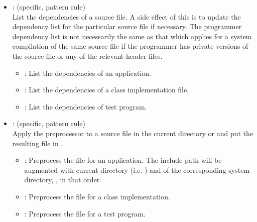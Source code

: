 \begin{itemize}
\item
    : (specific, pattern rule)
   \\ List the dependencies of a source file.  A side effect of this is to
   update the dependency list for the particular source file if necessary.
   The programmer dependency list is not necessarily the same as that which
   applies for a system compilation of the same source file if the programmer
   has private versions of the source file or any of the relevant header
   files.
   \begin{itemize}
   \item
      : List the dependencies of an application.
   \item
      : List the dependencies of a class implementation file.
   \item
      : List the dependencies of test program.
   \end{itemize}

\item
    : (specific, pattern rule)
   \\ Apply the  preprocessor  to a source file in the
   current directory or  and put the resulting 
   file in .
   \begin{itemize}
   \item
      : Preprocess the  file for an application.  The
      include path will be augmented with current directory (i.e. )
      and of the corresponding system directory, , in that
      order.
   \item
      : Preprocess the  file for a class implementation.
   \item
      : Preprocess the  file for a test program.
   \end{itemize}


\end{itemize}
